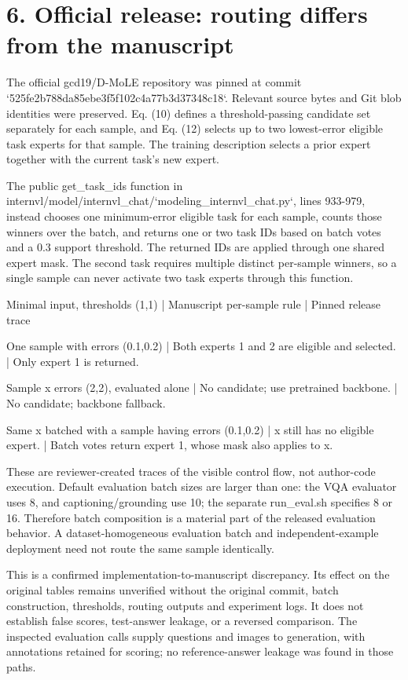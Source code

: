 \documentclass[10pt]{article}
\begin{document}
\section*{6. Official release: routing differs from the manuscript}
The official gcd19/D-MoLE repository was pinned at commit `525fe2b788da85ebe3f5f102c4a77b3d37348c18`. Relevant source bytes and Git blob identities were preserved. Eq. (10) defines a threshold-passing candidate set separately for each sample, and Eq. (12) selects up to two lowest-error eligible task experts for that sample. The training description selects a prior expert together with the current task’s new expert.\par
The public get\_task\_ids function in internvl/model/internvl\_chat/`modeling\_internvl\_chat.py`, lines 933-979, instead chooses one minimum-error eligible task for each sample, counts those winners over the batch, and returns one or two task IDs based on batch votes and a 0.3 support threshold. The returned IDs are applied through one shared expert mask. The second task requires multiple distinct per-sample winners, so a single sample can never activate two task experts through this function.\par
Minimal input, thresholds (1,1) | Manuscript per-sample rule | Pinned release trace\par
One sample with errors (0.1,0.2) | Both experts 1 and 2 are eligible and selected. | Only expert 1 is returned.\par
Sample x errors (2,2), evaluated alone | No candidate; use pretrained backbone. | No candidate; backbone fallback.\par
Same x batched with a sample having errors (0.1,0.2) | x still has no eligible expert. | Batch votes return expert 1, whose mask also applies to x.\par
These are reviewer-created traces of the visible control flow, not author-code execution. Default evaluation batch sizes are larger than one: the VQA evaluator uses 8, and captioning/grounding use 10; the separate run\_eval.sh specifies 8 or 16. Therefore batch composition is a material part of the released evaluation behavior. A dataset-homogeneous evaluation batch and independent-example deployment need not route the same sample identically.\par
This is a confirmed implementation-to-manuscript discrepancy. Its effect on the original tables remains unverified without the original commit, batch construction, thresholds, routing outputs and experiment logs. It does not establish false scores, test-answer leakage, or a reversed comparison. The inspected evaluation calls supply questions and images to generation, with annotations retained for scoring; no reference-answer leakage was found in those paths.\par
\end{document}
